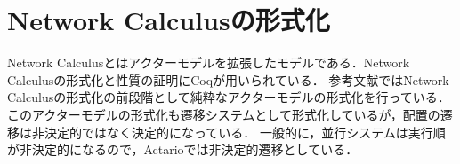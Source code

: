 \section{Network Calculusの形式化}

Network Calculus\cite{Garnock-Jones:2014aa}とはアクターモデルを拡張したモデルである．Network Calculusの形式化と性質の証明にCoqが用いられている．
参考文献\cite{Garnock-Jones:2014aa}ではNetwork Calculusの形式化の前段階として純粋なアクターモデルの形式化を行っている．
このアクターモデルの形式化も遷移システムとして形式化しているが，配置の遷移は非決定的ではなく決定的になっている．
一般的に，並行システムは実行順が非決定的になるので，Actarioでは非決定的遷移としている．
